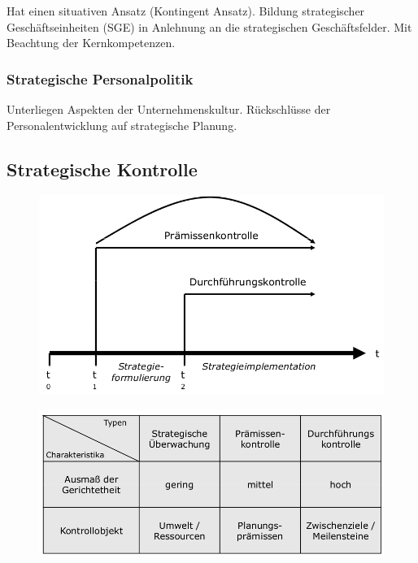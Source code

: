 \documentclass[a4paper,11pt, twoside]{article}
\begin{document}
Hat einen situativen Ansatz (Kontingent Ansatz). Bildung strategischer Geschäftseinheiten (SGE) in Anlehnung an die strategischen Geschäftsfelder. Mit Beachtung der Kernkompetenzen.

\subsubsection*{Strategische Personalpolitik}
Unterliegen Aspekten der Unternehmenskultur. Rückschlüsse der Personalentwicklung auf strategische Planung.

\subsection{Strategische Kontrolle}

\begin{figure}[h]
 \begin{center}
   \includegraphics[scale=0.3]{bilder/strategische_kontrolle1.png}
 \end{center}
\end{figure}

\begin{figure}[h]
 \begin{center}
   \includegraphics[scale=0.3]{bilder/strategische_kontrolle2.png}
 \end{center}
\end{figure}
\newpage
\end{document}
